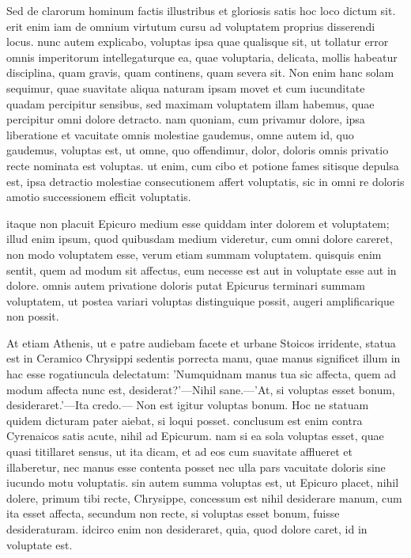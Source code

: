  Sed de clarorum hominum factis illustribus et gloriosis satis hoc loco dictum sit. erit enim iam de omnium virtutum cursu ad voluptatem proprius disserendi locus. nunc autem explicabo, voluptas ipsa quae qualisque sit, ut tollatur error omnis imperitorum intellegaturque ea, quae voluptaria, delicata, mollis habeatur disciplina, quam gravis, quam continens, quam severa sit. Non enim hanc solam sequimur, quae suavitate aliqua naturam ipsam movet et cum iucunditate quadam percipitur sensibus, sed maximam voluptatem illam habemus, quae percipitur omni dolore detracto. nam quoniam, cum privamur dolore, ipsa liberatione et vacuitate omnis molestiae gaudemus, omne autem id, quo gaudemus, voluptas est, ut omne, quo offendimur, dolor, doloris omnis privatio recte nominata est voluptas. ut enim, cum cibo et potione fames sitisque depulsa est, ipsa detractio molestiae consecutionem affert voluptatis, sic in omni re doloris amotio successionem efficit voluptatis.

 itaque non placuit Epicuro medium esse quiddam inter dolorem et voluptatem; illud enim ipsum, quod quibusdam medium videretur, cum omni dolore careret, non modo voluptatem esse, verum etiam summam voluptatem. quisquis enim sentit, quem ad modum sit affectus, eum necesse est aut in voluptate esse aut in dolore. omnis autem privatione doloris putat Epicurus terminari summam voluptatem, ut postea variari voluptas distinguique possit, augeri amplificarique non possit.

 At etiam Athenis, ut e patre audiebam facete et urbane Stoicos irridente, statua est in Ceramico Chrysippi sedentis porrecta manu, quae manus significet illum in hac esse rogatiuncula delectatum: 'Numquidnam manus tua sic affecta, quem ad modum affecta nunc est, desiderat?'—Nihil sane.—'At, si voluptas esset bonum, desideraret.'—Ita credo.— Non est igitur voluptas bonum. Hoc ne statuam quidem dicturam pater aiebat, si loqui posset. conclusum est enim contra Cyrenaicos satis acute, nihil ad Epicurum. nam si ea sola voluptas esset, quae quasi titillaret sensus, ut ita dicam, et ad eos cum suavitate afflueret et illaberetur, nec manus esse contenta posset nec ulla pars vacuitate doloris sine iucundo motu voluptatis. sin autem summa voluptas est, ut Epicuro placet, nihil dolere, primum tibi recte, Chrysippe, concessum est nihil desiderare manum, cum ita esset affecta, secundum non recte, si voluptas esset bonum, fuisse desideraturam. idcirco enim non desideraret, quia, quod dolore caret, id in voluptate est.

